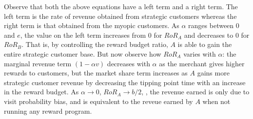 Observe that both the above equations have a left term and a right term. The left term is the rate of revenue obtained from strategic customers whereas the right term is that obtained from the myopic customers.
As $\alpha$ ranges between $0$ and $e$, the value on the left term increases from $0$ for $RoR_A$ and decreases to $0$ for $RoR_B$.
That is, by controlling the reward budget ratio, $A$ is able to gain the entire strategic customer base.
But now observe how $RoR_A$ varies with $\alpha$:
the marginal revenue term $(1-\alpha v)$ decreases with $\alpha$ as the merchant gives higher rewards to customers, but the market share term increases as $A$ gains more strategic customer revenue by decreasing the tipping point time with an increase in the reward budget.
As $\alpha \to 0$, $RoR_A \to b/2$, \ie, the revenue earned is only due to visit probability bias, and is equivalent to the reveue earned by $A$ when not running any reward program.

